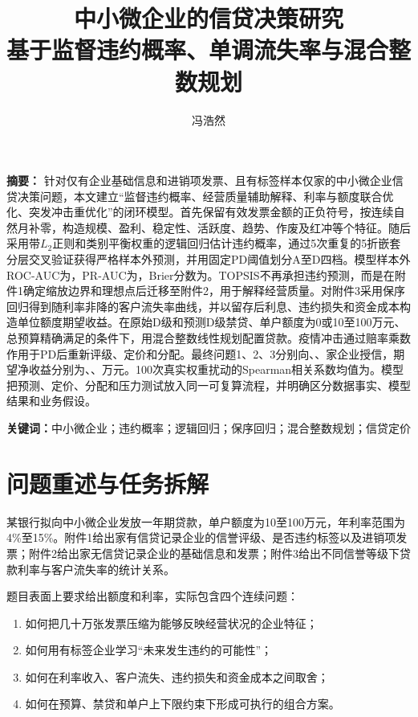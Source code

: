 \documentclass[12pt,a4paper]{ctexart}
\title{\vspace{-1.7cm}\heiti\zihao{2}中小微企业的信贷决策研究\\
\vspace{0.3cm}\normalfont\zihao{4}基于监督违约概率、单调流失率与混合整数规划}
\author{\zihao{4}冯浩然}
\date{}
\begin{document}
\maketitle

\begin{center}
\begin{minipage}{0.94\textwidth}
\textbf{摘要：}
针对仅有企业基础信息和进销项发票、且有标签样本仅\AttachmentOneEnterprises 家的中小微企业信贷决策问题，本文建立“监督违约概率、经营质量辅助解释、利率与额度联合优化、突发冲击重优化”的闭环模型。首先保留有效发票金额的正负符号，按连续自然月补零，构造规模、盈利、稳定性、活跃度、趋势、作废及红冲等\ModelFeatureCount 个特征。随后采用带$L_2$正则和类别平衡权重的逻辑回归估计违约概率，通过5次重复的5折嵌套分层交叉验证获得严格样本外预测，并用固定PD阈值划分A至D四档。模型样本外ROC-AUC为\ModelAUC，PR-AUC为\ModelPRAUC，Brier分数为\ModelBrier。TOPSIS不再承担违约预测，而是在附件1确定缩放边界和理想点后迁移至附件2，用于解释经营质量。对附件3采用保序回归得到随利率非降的客户流失率曲线，并以留存后利息、违约损失和资金成本构造单位额度期望收益。在原始D级和预测D级禁贷、单户额度为0或10至100万元、总预算精确满足的条件下，用混合整数线性规划配置贷款。疫情冲击通过赔率乘数作用于PD后重新评级、定价和分配。最终问题1、2、3分别向\PoneLoanCount、\PtwoLoanCount、\PthreeLoanCount 家企业授信，期望净收益分别为\PoneNetProfit、\PtwoNetProfit、\PthreeNetProfit 万元。100次真实权重扰动的Spearman相关系数均值为\SensitivityMean。模型把预测、定价、分配和压力测试放入同一可复算流程，并明确区分数据事实、模型结果和业务假设。

\textbf{关键词：}中小微企业；违约概率；逻辑回归；保序回归；混合整数规划；信贷定价
\end{minipage}
\end{center}

\newpage
\tableofcontents
\newpage

\section{问题重述与任务拆解}

某银行拟向中小微企业发放一年期贷款，单户额度为10至100万元，年利率范围为4\%至15\%。附件1给出\AttachmentOneEnterprises 家有信贷记录企业的信誉评级、是否违约标签以及进销项发票；附件2给出\AttachmentTwoEnterprises 家无信贷记录企业的基础信息和发票；附件3给出不同信誉等级下贷款利率与客户流失率的统计关系。

题目表面上要求给出额度和利率，实际包含四个连续问题：

\begin{enumerate}
\item 如何把几十万张发票压缩为能够反映经营状况的企业特征；
\item 如何用有标签企业学习“未来发生违约的可能性”；
\item 如何在利率收入、客户流失、违约损失和资金成本之间取舍；
\item 如何在预算、禁贷和单户上下限约束下形成可执行的组合方案。
\end{enumerate}
\end{document}
